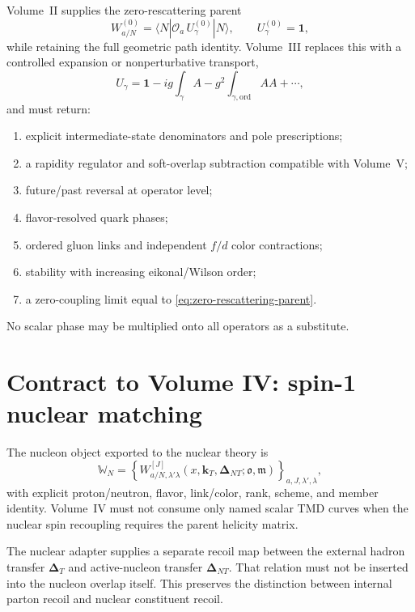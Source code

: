 \documentclass[11pt]{article}
\newcommand{\kT}{\bm{k}_{T}}
\newcommand{\DT}{\bm{\Delta}_{T}}
\newcommand{\DNT}{\bm{\Delta}_{N T}}
\newcommand{\cO}{\mathcal O}
\newcommand{\bbone}{\bm 1}
\begin{document}
Volume~II supplies the zero-rescattering parent
\begin{equation}
 W_{a/N}^{(0)}
 =\langle N|\cO_a\,U_\gamma^{(0)}|N\rangle,
 \qquad
 U_\gamma^{(0)}=\bbone,
\label{eq:zero-rescattering-parent}
\end{equation}
while retaining the full geometric path identity.  Volume~III replaces this
with a controlled expansion or nonperturbative transport,
\begin{equation}
 U_\gamma
 =\bbone-ig\int_\gamma A
 -g^2\int_{\gamma,\mathrm{ord}}AA+\cdots,
\label{eq:wilson-expansion-contract}
\end{equation}
and must return:
\begin{enumerate}
\item explicit intermediate-state denominators and pole prescriptions;
\item a rapidity regulator and soft-overlap subtraction compatible with
      Volume~V;
\item future/past reversal at operator level;
\item flavor-resolved quark phases;
\item ordered gluon links and independent \(f/d\) color contractions;
\item stability with increasing eikonal/Wilson order;
\item a zero-coupling limit equal to \cref{eq:zero-rescattering-parent}.
\end{enumerate}
No scalar phase may be multiplied onto all operators as a substitute.

\section{Contract to Volume IV: spin-1 nuclear matching}
\label{sec:volume-iv-contract}

The nucleon object exported to the nuclear theory is
\begin{equation}
 \mathbb W_N=
 \left\{
 W_{a/N,\lambda'\lambda}^{[J]}
 (x,\kT,\DNT;\mathfrak o,\mathfrak m)
 \right\}_{a,J,\lambda',\lambda},
\label{eq:nucleon-export-object}
\end{equation}
with explicit proton/neutron, flavor, link/color, rank, scheme, and member
identity.  Volume~IV must not consume only named scalar TMD curves when the
nuclear spin recoupling requires the parent helicity matrix.

The nuclear adapter supplies a separate recoil map between the external
hadron transfer \(\DT\) and active-nucleon transfer \(\DNT\).  That relation
must not be inserted into the nucleon overlap itself.  This preserves the
distinction between internal parton recoil and nuclear constituent recoil.
\end{document}

